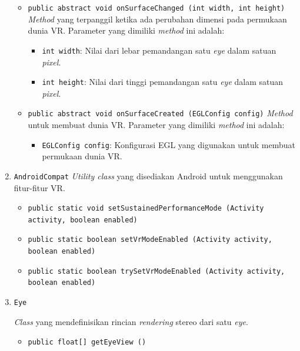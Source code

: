 \begin{enumerate}
\begin{itemize}
				\item \texttt{public abstract void onSurfaceChanged (int width, int height)}
				\textit{Method}	yang terpanggil ketika ada perubahan dimensi pada permukaan dunia VR. Parameter yang dimiliki \textit{method} ini adalah:
				
				\begin{itemize}
					\item \texttt{int width}: Nilai dari lebar pemandangan satu \textit{eye} dalam satuan \textit{pixel}.
					
					\item \texttt{int height}: Nilai dari tinggi pemandangan satu \textit{eye} dalam satuan \textit{pixel}.
				\end{itemize}
				
				\item \texttt{public abstract void onSurfaceCreated (EGLConfig config)}
\textit{Method} untuk membuat dunia VR. Parameter yang dimiliki \textit{method} ini adalah:
				\begin{itemize}
					\item \texttt{EGLConfig config}: Konfigurasi EGL yang digunakan untuk membuat permukaan dunia VR.
				\end{itemize}
			\end{itemize}					
		
		\item \texttt{AndroidCompat}
		\textit{Utility class} yang disediakan Android untuk menggunakan fitur-fitur VR.  
		
			\begin{itemize}
				\item \texttt{public static void setSustainedPerformanceMode (Activity activity, boolean enabled)}
				
				
				\item \texttt{public static boolean setVrModeEnabled (Activity activity, boolean enabled)}
				
				\item \texttt{public static boolean trySetVrModeEnabled (Activity activity, boolean enabled)}
			\end{itemize}					
				
		
		\item \texttt{Eye}
		
		\textit{Class} yang mendefinisikan rincian \textit{rendering} stereo dari satu \textit{eye}. 
			\begin{itemize}
				\item \texttt{public float[] getEyeView ()}
				

\end{itemize}
\end{enumerate}
